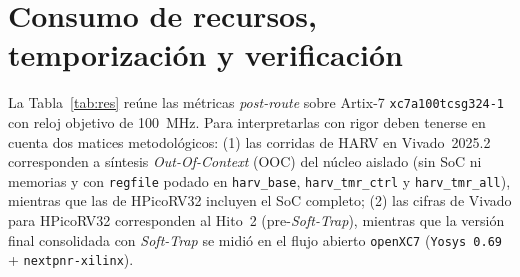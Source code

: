 \documentclass[a4paper,10pt]{article}
\begin{document}
\section{Consumo de recursos, temporización y verificación}

La Tabla~\ref{tab:res} reúne las métricas \textit{post-route} sobre Artix-7 \texttt{xc7a100tcsg324-1} con reloj objetivo de 100~MHz. Para interpretarlas con rigor deben tenerse en cuenta dos matices metodológicos: (1) las corridas de HARV en Vivado~2025.2 corresponden a síntesis \textit{Out-Of-Context} (OOC) del núcleo aislado (sin SoC ni memorias y con \texttt{regfile} podado en \texttt{harv\_base}, \texttt{harv\_tmr\_ctrl} y \texttt{harv\_tmr\_all}), mientras que las de HPicoRV32 incluyen el SoC completo; (2) las cifras de Vivado para HPicoRV32 corresponden al Hito~2 (pre-\textit{Soft-Trap}), mientras que la versión final consolidada con \textit{Soft-Trap} se midió en el flujo abierto \texttt{openXC7} (\texttt{Yosys 0.69} + \texttt{nextpnr-xilinx}).
\end{document}

